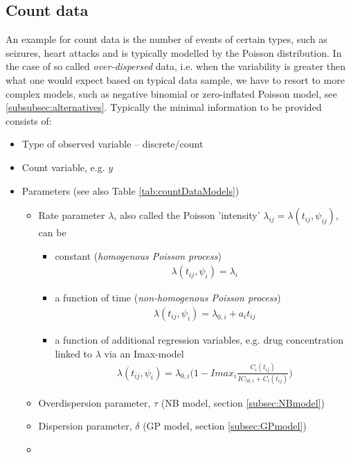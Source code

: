 \subsection{Count data}
\label{subsec:mmCountData}
An example for count data is the number of events of certain types, such as seizures, heart attacks and 
is typically modelled by the Poisson distribution. In the case of so called \textit{over-dispersed} 
data, i.e. when the variability is greater then what one would expect based on typical data sample, 
we have to resort to more complex models, such as negative binomial or zero-inflated Poisson model, 
see \ref{subsubsec:alternatives}.
Typically the minimal information to be provided consists of:
\begin{itemize}
\item
Type of observed variable -- discrete/count
\item
Count variable, e.g. $y$
\item
Parameters (see also Table \ref{tab:countDataModels})
\begin{itemize}
\item
Rate parameter $\lambda$, also called the Poisson 'intensity' $\lambda_{ij} = \lambda(t_{ij}, \psi_{ij})$, can be
\begin{itemize} %
\item
constant (\emph{homogenous Poisson process})
\begin{eqnarray}
\lambda(t_{ij}, \psi_{i}) = \lambda_{i} \nonumber
\end{eqnarray}
\item
a function of time (\emph{non-homogenous Poisson process})
\begin{eqnarray}
\lambda(t_{ij}, \psi_{i}) = \lambda_{0,i} + a_i t_{ij} \nonumber
\end{eqnarray}
\item
a function of additional regression variables, e.g. drug concentration linked to $\lambda$ via an Imax-model
\begin{eqnarray}
\lambda(t_{ij}, \psi_{i}) = \lambda_{0,i} \Big(1 - Imax_i \frac{C_i(t_{ij})}{IC_{50,i} + C_i(t_{ij})} \Big) \nonumber
\end{eqnarray}
\end{itemize}
\item
Overdispersion parameter, $\tau$ (NB model, section \ref{subsec:NBmodel})
\item
Dispersion parameter, $\delta$ (GP model, section \ref{subsec:GPmodel})
\item

\end{itemize}
\end{itemize}
